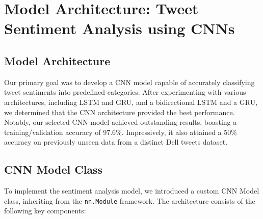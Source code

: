 \section{Model Architecture: Tweet Sentiment Analysis using CNNs}

\subsection{Model Architecture}
\vspace{-1em}
Our primary goal was to develop a CNN model capable of accurately classifying tweet sentiments into predefined categories. After experimenting with various architectures, including LSTM and GRU, and a bidirectional LSTM and a GRU, we determined that the CNN architecture provided the best performance. Notably, our selected CNN model achieved outstanding results, boasting a training/validation accuracy of 97.6\%. Impressively, it also attained a 50\% accuracy on previously unseen data from a distinct Dell tweets dataset.
\vspace{-1em}
\subsection{CNN Model Class}
\vspace{-1em}
To implement the sentiment analysis model, we introduced a custom CNN Model class, inheriting from the \texttt{nn.Module} framework. The architecture consists of the following key components:

